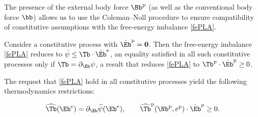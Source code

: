 The presence of the external body force $\Bb^{\rm p}$ (as well as the conventional body
force $\bb$) allows us to use the Coleman–Noll procedure to ensure compatibility of constitutive assumptions with the free-energy imbalance \eqref{fePLA}. 

Consider a constitutive process with $\dot\Eb^{\rm p}=\mathbf{0}$. Then the free-energy imbalance \eqref{fePLA} reduces to $\dot\psi\leq \Tb\cdot\dot\Eb^{\rm e}$, an equality satisfied in all such constitutive processes only if $\Tb=\partial_{\Eb}\psi$, a result that reduces \eqref{fePLA} to $\Tb^{\rm p}\cdot \dot\Eb^{\rm p}\geq 0$.

The request that \eqref{fePLA}  hold in all constitutive processes yield the following thermodynamics restrictions:
\begin{definition}
	\begin{equation}\label{threstr}
\widehat{\Tb}(\Eb^{\rm e})=\partial_{\Eb}\widehat{\psi}(\Eb^{\rm e}), \qquad \widehat{\Tb}^{\rm p}(\Nb^{\rm p}, e^{\rm p})\cdot \dot\Eb^{\rm p}\geq 0.
\end{equation}
\end{definition}

